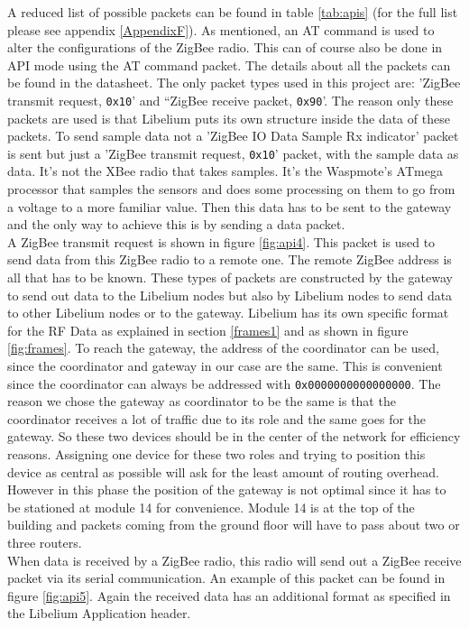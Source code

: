 \label{api1}
\noindent
A reduced list of possible packets can be found in table \ref{tab:apis} (for the full list please see appendix \ref{AppendixF}). As mentioned, an AT command is used to alter the configurations of the ZigBee radio. This can of course also be done in API mode using the AT command packet.  The details about all the packets can be found in the datasheet. The only packet types used in this project are: 'ZigBee transmit request, \verb+0x10+' and “ZigBee receive packet, \verb+0x90+'. The reason only these packets are used is that Libelium puts its own structure inside the data of these packets. To send sample data not a 'ZigBee IO Data Sample Rx indicator' packet is sent but just a 'ZigBee transmit request, \verb+0x10+' packet, with the sample data as data. It's not the XBee radio that takes samples. It's the Waspmote's ATmega processor that samples the sensors and does some processing on them to go from a voltage to a more familiar value. Then this data has to be sent to the gateway and the only way to achieve this is by sending a data packet.\\
A ZigBee transmit request is shown in figure \ref{fig:api4}. This packet is used to send data from this ZigBee radio to a remote one. The remote ZigBee address is all that has to be known. These types of packets are constructed by the gateway to send out data to the Libelium nodes but also by Libelium nodes to send data to other Libelium nodes or to the gateway. Libelium has its own specific format for the RF Data as explained in section \ref{frames1} and as shown in figure \ref{fig:frames}. To reach the gateway, the address of the coordinator can be used, since the coordinator and gateway in our case are the same. This is convenient since the coordinator can always be addressed with \verb+0x0000000000000000+. The reason we chose the gateway as coordinator to be the same is that the coordinator receives a lot of traffic due to its role and the same goes for the gateway. So these two devices should be in the center of the network for efficiency reasons. Assigning one device for these two roles and trying to position this device as central as possible will ask for the least amount of routing overhead. However in this phase the position of the gateway is not optimal since it has to be stationed at module 14 for convenience. Module 14 is at the top of the building and packets coming from the ground floor will have to pass about two or three routers.\\
When data is received by a ZigBee radio, this radio will send out a ZigBee receive packet via its serial communication. An example of this packet can be found in figure \ref{fig:api5}. Again the received data has an additional format as specified in the Libelium Application header. 


